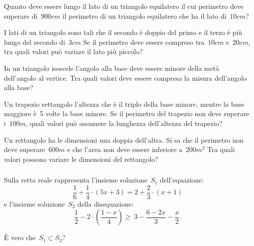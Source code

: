 \begin{multicols}{2}
 \begin{esercizio}[\Ast]
 \label{ese:21.28}
 Quanto deve essere lungo il lato di un triangolo equilatero il cui
perimetro deve superare di~$900\unit{cm}$ il perimetro di un triangolo
equilatero che ha il lato di~$10\unit{cm}$?
 \end{esercizio}

 \begin{esercizio}[\Ast]
 \label{ese:21.29}
 I lati di un triangolo sono tali che il secondo è doppio del primo e
il terzo è più lungo del secondo di~$3\unit{cm}$ Se il perimetro deve
essere compreso tra~$10\unit{cm}$ e~$20\unit{cm}$, tra quali valori può variare il lato
più piccolo?
 \end{esercizio}

 \begin{esercizio}[\Ast]
 \label{ese:21.30}
 In un triangolo isoscele l'angolo
alla base deve essere minore della metà dell'angolo
al vertice. Tra quali valori deve essere compresa la misura
dell'angolo alla base?
 \end{esercizio}

 \begin{esercizio}[\Ast]
 \label{ese:21.31}
 Un trapezio rettangolo l'altezza che è il triplo
della base minore, mentre la base maggiore è~5 volte la base minore.
Se il perimetro del trapezio non deve superare i~$100\unit{m}$, quali valori
può assumere la lunghezza dell'altezza del
trapezio?
 \end{esercizio}

 \begin{esercizio}[\Ast]
 \label{ese:21.32}
 Un rettangolo ha le dimensioni una doppia dell'altra.
Si sa che il perimetro non deve superare~$600\unit{m}$ e che
l'area non deve essere inferiore a~$200\unit{m^2}$ Tra quali
valori possono variare le dimensioni del rettangolo?
 \end{esercizio}
\end{multicols}

\subsubsection*{}

\begin{esercizio}
 \label{ese:21.33}
Sulla retta reale rappresenta l'insieme soluzione~$S_{1}$
dell'equazione:
\[\frac{1}{6}+\frac{1}{4}\cdot (5x+3)=2+\frac{2}{3}\cdot (x+1)\]
\newpage
e l'insieme soluzione~$S_{2}$ della disequazione:
\[\frac{1}{2}-2\cdot\left(\frac{1-x}{4}\right)\ge~3-\frac{6-2x}{3}-\frac{x}{2}.\]

È vero che~$S_{1}\subset S_{2}$?
\end{esercizio}

